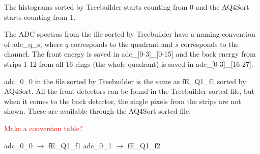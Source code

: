 \documentclass[twoside,english]{uiofysmaster/uiofysmaster}
\begin{document}
The histograms sorted by Treebuilder starts counting from 0 and the AQ4Sort starts counting from 1. 

The ADC spectras from the file sorted by Treebuilder have a naming convention of adc\_q\_s, where $q$ corresponds to the quadrant and $s$ corresponds to the channel. The front energy is saved in adc\_[0-3]\_[0-15] and the back energy from strips 1-12 from all 16 rings (the whole quadrant) is saved in adc\_[0-3]\_[16-27].

adc\_0\_0 in the file sorted by Treebuilder is the same as fE\_Q1\_f1 sorted by AQ4Sort. All the front detectors can be found in the Treebuilder-sorted file, but when it comes to the back detector, the single pixels from the strips are not shown. These are available through the AQ4Sort sorted file.



\bigskip

\textcolor{red}{Make a conversion table?}

adc\_0\_0 $\rightarrow$ fE\_Q1\_f1 \newline
adc\_0\_1 $\rightarrow$ fE\_Q1\_f2
\end{document}
